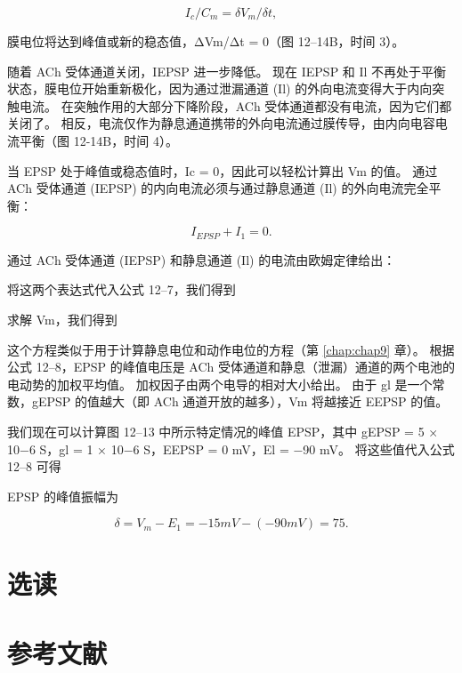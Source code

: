 \begin{equation}\label{rate_potential}
	I_c / C_m = \delta V_m / \delta t,
\end{equation}

膜电位将达到峰值或新的稳态值，ΔVm/Δt = 0（图 12–14B，时间 3）。

随着 ACh 受体通道关闭，IEPSP 进一步降低。
现在 IEPSP 和 Il 不再处于平衡状态，膜电位开始重新极化，因为通过泄漏通道 (Il) 的外向电流变得大于内向突触电流。
在突触作用的大部分下降阶段，ACh 受体通道都没有电流，因为它们都关闭了。
相反，电流仅作为静息通道携带的外向电流通过膜传导，由内向电容电流平衡（图 12-14B，时间 4）。


当 EPSP 处于峰值或稳态值时，Ic = 0，因此可以轻松计算出 Vm 的值。
通过 ACh 受体通道 (IEPSP) 的内向电流必须与通过静息通道 (Il) 的外向电流完全平衡：

\begin{equation}\label{outward_current}
	I_{EPSP} + I_1 = 0.
\end{equation}

通过 ACh 受体通道 (IEPSP) 和静息通道 (Il) 的电流由欧姆定律给出：

将这两个表达式代入公式 12–7，我们得到

求解 Vm，我们得到

这个方程类似于用于计算静息电位和动作电位的方程（第 \ref{chap:chap9} 章）。 
根据公式 12–8，EPSP 的峰值电压是 ACh 受体通道和静息（泄漏）通道的两个电池的电动势的加权平均值。 
加权因子由两个电导的相对大小给出。 由于 gl 是一个常数，gEPSP 的值越大（即 ACh 通道开放的越多），Vm 将越接近 EEPSP 的值。


我们现在可以计算图 12–13 中所示特定情况的峰值 EPSP，其中 gEPSP = 5 × 10−6 S，gl = 1 × 10−6 S，EEPSP = 0 mV，El = −90 mV。 将这些值代入公式 12–8 可得

EPSP 的峰值振幅为

\begin{equation}\label{peak_amplitude}
	\delta = V_m - E_1 = -15mV - (-90mV) = 75.
\end{equation}



\section{选读}

\section{参考文献}